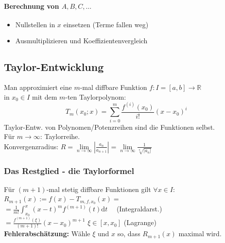 \documentclass[6pt,a4paper]{scrartcl}
\newcommand{\abs}[1]{\ensuremath{\left\vert#1\right\vert}}
\newcommand{\ra}[0]{\ensuremath{\rightarrow}}
\begin{document}
\begin{multicols*}{4}
\paragraph{Berechnung von $A,B,C,\dots$}
\begin{itemize}\itemsep0pt
\item Nullstellen in $x$ einsetzen (Terme fallen weg)
\item Ausmultiplizieren und Koeffizientenvergleich
\end{itemize}


\subsection{Taylor-Entwicklung}
Man approximiert eine $m$-mal diffbare Funktion $f:I=[a,b] \rightarrow \mathbb R$ \\ in $x_0 \in I$ mit dem $m$-ten Taylorpolynom:\\
\begin{equation*}
T_{m}(x_0;x)= \sum_{i=0}^{m} \frac{f^{(i)}(x_0)}{i!}(x-x_0)^i
\end{equation*}
Taylor-Entw. von Polynomen/Potenzreihen sind die Funktionen selbst.\\
Für $m \ra \infty$: Taylorreihe. \\
Konvergenzradius: $R = \underset{n\rightarrow \infty}{\lim} \abs{\frac{a_n}{a_{n+1}}}=\lim\limits_{n\rightarrow \infty}\frac{1}{\sqrt[n]{\abs{a_n}}}$

	\subsubsection{Das Restglied - die Taylorformel}
	Für $(m+1)$-mal stetig diffbare Funktionen gilt $\forall x \in I:$\\
	$R_{m+1}(x) := f(x)- T_{m,f,x_0}(x) =$  \\
	$= \frac{1}{m!} \int_{x_0}^{x}(x-t)^m f^{(m+1)}(t)\mathrm dt$ \ \  (Integraldarst.)\\
	$= \frac{f^{(m+1)}(\xi)}{(m+1)!}(x-x_0)^{m+1}$ \quad
	$\xi \in [x, x_0]$ (Lagrange) \\
	\textbf{Fehlerabschätzung:} Wähle $\xi$ und $x$ so, dass $R_{m+1}(x)$ maximal wird.


\end{multicols*}
\end{document}
